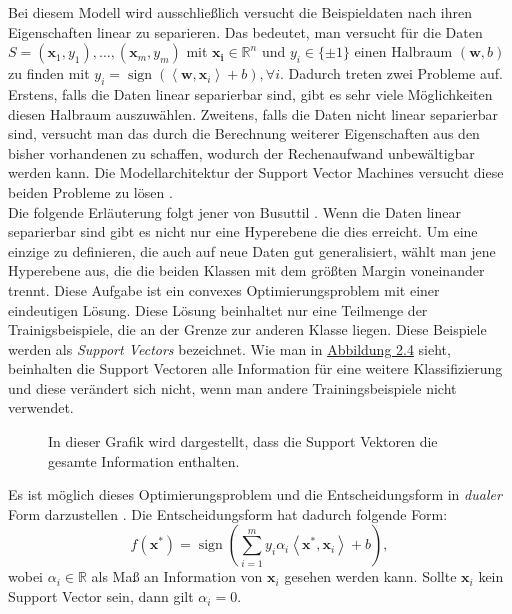 Bei diesem Modell wird ausschlie{\ss}lich versucht die Beispieldaten nach ihren Eigenschaften linear zu separieren. Das bedeutet, man versucht f\"ur die
Daten $S = (\mathbf{x}_1,y_1),\dots, (\mathbf{x}_m, y_m)$ mit $\mathbf{x_i} \in \mathbb{R}^n$ und $y_i \in \{\pm1\}$ einen Halbraum $(\mathbf{w},b)$ zu finden
mit $y_i = \operatorname{sign}(\left\langle \mathbf{w},\mathbf{x}_i\right\rangle + b), \forall i$. Dadurch treten zwei Probleme auf. Erstens, falls die Daten linear separierbar sind,
gibt es sehr viele M\"oglichkeiten diesen Halbraum auszuw\"ahlen. Zweitens, falls die Daten nicht linear separierbar sind, versucht man das durch die Berechnung
weiterer Eigenschaften aus den bisher vorhandenen zu schaffen, wodurch der Rechenaufwand unbew\"altigbar werden kann. Die Modellarchitektur der Support Vector Machines versucht
diese beiden Probleme zu l\"osen \cite[Kapitel 15]{shalev}. \\

Die folgende Erl\"auterung folgt jener von Busuttil \cite{SVM1}. Wenn die Daten linear separierbar sind gibt es nicht nur eine Hyperebene die dies erreicht.
Um eine einzige zu definieren, die auch auf neue Daten gut generalisiert, w\"ahlt man jene Hyperebene aus, die die beiden Klassen mit dem gr\"o{\ss}ten Margin
voneinander trennt. Diese Aufgabe ist ein convexes Optimierungsproblem mit einer eindeutigen L\"osung. Diese L\"osung beinhaltet nur eine Teilmenge der Trainigsbeispiele, die
an der Grenze zur anderen Klasse liegen. Diese Beispiele werden als \textit{Support Vectors} bezeichnet. Wie man in \hyperref[fig:svm2]{Abbildung 2.4} sieht, beinhalten die Support Vectoren
alle Information f\"ur eine weitere Klassifizierung und diese ver\"andert sich nicht, wenn man andere Trainingsbeispiele nicht verwendet. \\

\begin{figure}[ht]
	\label{fig:svm1}
	\begin{center}
		\begin{tiny}
		\end{tiny}
	\end{center}
	\caption[Darstellung der Support Vektoren]
	{In dieser Grafik wird dargestellt, dass die Support Vektoren die gesamte Information enthalten.}
\end{figure}



Es ist m\"oglich dieses Optimierungsproblem und die Entscheidungsform in \textit{dualer} Form darzustellen \cite[Seite 168]{handson}. Die Entscheidungsform hat dadurch folgende Form:
$$ f(\mathbf{x^*}) = \operatorname{sign}(\sum_{i=1}^m y_i\alpha_i \left\langle \mathbf{x^*}, \mathbf{x}_i \right\rangle + b), $$
wobei $\alpha_i \in \mathbb{R}$ als Ma{\ss} an Information von $\mathbf{x}_i$ gesehen werden kann. Sollte $\mathbf{x}_i$ kein Support Vector sein, dann gilt $\alpha_i = 0$.\\

